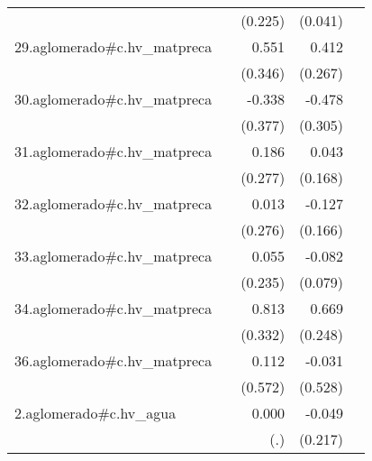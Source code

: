 {\begin{longtable}{l*{4}{D{.}{.}{-1}}}
            &                     &     (0.225)         &     (0.041)         &                     \\
\addlinespace
29.aglomerado#c.hv\_matpreca&                     &       0.551         &       0.412         &                     \\
            &                     &     (0.346)         &     (0.267)         &                     \\
\addlinespace
30.aglomerado#c.hv\_matpreca&                     &      -0.338         &      -0.478         &                     \\
            &                     &     (0.377)         &     (0.305)         &                     \\
\addlinespace
31.aglomerado#c.hv\_matpreca&                     &       0.186         &       0.043         &                     \\
            &                     &     (0.277)         &     (0.168)         &                     \\
\addlinespace
32.aglomerado#c.hv\_matpreca&                     &       0.013         &      -0.127         &                     \\
            &                     &     (0.276)         &     (0.166)         &                     \\
\addlinespace
33.aglomerado#c.hv\_matpreca&                     &       0.055         &      -0.082         &                     \\
            &                     &     (0.235)         &     (0.079)         &                     \\
\addlinespace
34.aglomerado#c.hv\_matpreca&                     &       0.813\sym{*}  &       0.669\sym{**} &                     \\
            &                     &     (0.332)         &     (0.248)         &                     \\
\addlinespace
36.aglomerado#c.hv\_matpreca&                     &       0.112         &      -0.031         &                     \\
            &                     &     (0.572)         &     (0.528)         &                     \\
\addlinespace
2.aglomerado#c.hv\_agua&                     &       0.000         &      -0.049         &                     \\
            &                     &         (.)         &     (0.217)         &                     \\

\end{longtable}}
